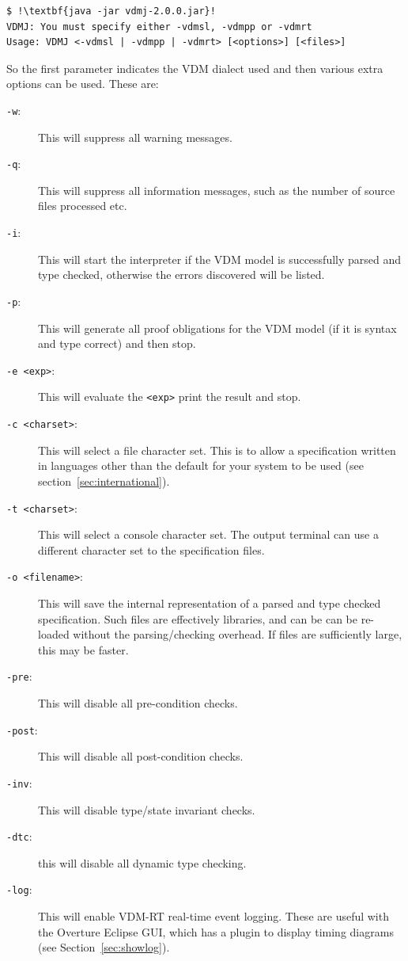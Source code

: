 \documentclass{overturerep}
\begin{document}
{\lstset{style=tool,language=}
\begin{lstlisting}
$ !\textbf{java -jar vdmj-2.0.0.jar}!
VDMJ: You must specify either -vdmsl, -vdmpp or -vdmrt
Usage: VDMJ <-vdmsl | -vdmpp | -vdmrt> [<options>] [<files>]
\end{lstlisting}
\lstset{style=mystyle}
\lstset{language=VDM++}

So the first parameter indicates the VDM dialect used and then
various extra options can be used. These are:

\begin{description}
\item[\texttt{-w}:] This will suppress all warning messages.
\item[\texttt{-q}:] This will suppress all information messages, such as
 the number of source files processed etc.
\item[\texttt{-i}:] This will start the interpreter if the VDM
  model is successfully parsed and type checked, otherwise the errors discovered
  will be listed.
\item[\texttt{-p}:] This will generate all proof obligations for the
  VDM model (if it is syntax and type correct) and then 
  stop.
\item[\texttt{-e <exp>}:] This will evaluate the \texttt{<exp>} print
  the result and stop.
\item[\texttt{-c <charset>}:] This will select a file character set. This is to
allow a specification written in languages other than the default for your system
to be used (see section~\ref{sec:international}). 
\item[\texttt{-t <charset>}:] This will select a console character set. The output
terminal can use a different character set to the specification files.
\item[\texttt{-o <filename>}:] This will save the internal
  representation of a parsed and type checked spe\-ci\-fication. Such files are
effectively libraries, and can be can be re-loaded without the
parsing/checking overhead. If files are sufficiently large, this may be faster.
\item[\texttt{-pre}:] This will disable all pre-condition checks.
\item[\texttt{-post}:] This will disable all post-condition checks.
\item[\texttt{-inv}:] This will disable type/state invariant checks.
\item[\texttt{-dtc}:] this will disable all dynamic type checking.
\item[\texttt{-log}:] This will enable VDM-RT real-time event logging. These
  are useful with the Overture Eclipse GUI, which has a plugin to
  display timing diagrams (see Section~\ref{sec:showlog}).
\end{description}

}
\end{document}

